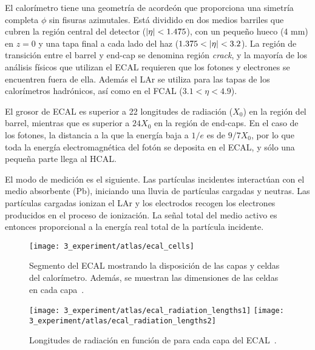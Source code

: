 El calorímetro tiene una geometría de acordeón que proporciona una simetría completa \(\phi\) sin fisuras azimutales.
Está dividido en dos medios barriles que cubren la región central del detector (\(|\eta|<1.475\)), con un pequeño hueco (4 mm) en $z = 0$ y una tapa final a cada lado del haz (\(1.375<\abseta<3.2\)).
La región de transición entre el barrel y end-cap se denomina región \textit{crack}, y la mayoría de los análisis físicos que utilizan el \ac{ECAL} requieren que los fotones y electrones se encuentren fuera de ella.
Además el \ac{LAr} se utiliza para las tapas de los calorímetros hadrónicos, así como en el \acf{FCAL} ($3.1 < \eta < 4.9$).

El grosor de \ac{ECAL} es superior a 22 longitudes de radiación (\(X_0\)) en la región del barrel, mientras que es superior a \(24 X_0\) en la región de end-caps. En el caso de los fotones, la distancia a la que la energía baja a \(1/e\) es de \(9/7 X_0\), por lo que toda la energía electromagnética del fotón se deposita en el \ac{ECAL}, y sólo una pequeña parte llega al \ac{HCAL}.

El modo de medición es el siguiente. Las partículas incidentes interactúan con el medio absorbente (Pb), iniciando una lluvia de partículas cargadas y neutras. Las partículas cargadas ionizan el \ac{LAr} y los electrodos recogen los electrones producidos en el proceso de ionización. La señal total del medio activo es entonces proporcional a la energía real total de la partícula incidente.

\begin{figure}[ht!]
    \centering
    \texttt{[image: 3\_experiment/atlas/ecal\_cells]}
    \caption{Segmento del \ac{ECAL} mostrando la disposición de las capas y celdas del calorímetro. Además, se muestran las dimensiones de las celdas en cada capa~\cite{ATLAS}.}
    \label{fig:atlas:atlas:cals:ecal:ecal_cells}
\end{figure}

\begin{figure}[ht!]
    \centering
    \texttt{[image: 3\_experiment/atlas/ecal\_radiation\_lengths1]}
    \texttt{[image: 3\_experiment/atlas/ecal\_radiation\_lengths2]}
    \caption{Longitudes de radiación en función de \abseta para cada capa del \ac{ECAL}~\cite{ATLAS}.}
    \label{fig:atlas:atlas:cals:ecal:ecal_radiation_length}
\end{figure}

